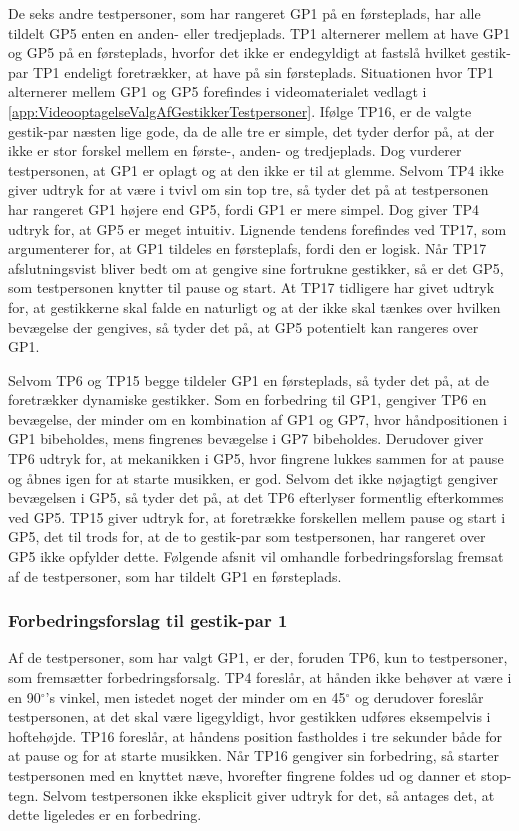 De seks andre testpersoner, som har rangeret GP1 på en førsteplads, har alle tildelt GP5 enten en anden- eller tredjeplads. TP1 alternerer mellem at have GP1 og GP5 på en førsteplads, hvorfor det ikke er endegyldigt at fastslå hvilket gestik-par TP1 endeligt foretrækker, at have på sin førsteplads. Situationen hvor TP1 alternerer mellem GP1 og GP5 forefindes i videomaterialet vedlagt i \autoref{app:VideooptagelseValgAfGestikkerTestpersoner}. Ifølge TP16, er de valgte gestik-par næsten lige gode, da de alle tre er simple, det tyder derfor på, at der ikke er stor forskel mellem en første-, anden- og tredjeplads. Dog vurderer testpersonen, at GP1 er oplagt og at den ikke er til at glemme. Selvom TP4 ikke giver udtryk for at være i tvivl om sin top tre, så tyder det på at testpersonen har rangeret GP1 højere end GP5, fordi GP1 er mere simpel. Dog giver TP4 udtryk for, at GP5 er meget intuitiv. Lignende tendens forefindes ved TP17, som argumenterer for, at GP1 tildeles en førsteplafs, fordi den er logisk. Når TP17 afslutningsvist bliver bedt om at gengive sine fortrukne gestikker, så er det GP5, som testpersonen knytter til pause og start. At TP17 tidligere har givet udtryk for, at gestikkerne skal falde en naturligt og at der ikke skal tænkes over hvilken bevægelse der gengives, så tyder det på, at GP5 potentielt kan rangeres over GP1.

Selvom TP6 og TP15 begge tildeler GP1 en førsteplads, så tyder det på, at de foretrækker dynamiske gestikker. Som en forbedring til GP1, gengiver TP6 en bevægelse, der minder om en kombination af GP1 og GP7, hvor håndpositionen i GP1 bibeholdes, mens fingrenes bevægelse i GP7 bibeholdes. Derudover giver TP6 udtryk for, at mekanikken i GP5, hvor fingrene lukkes sammen for at pause og åbnes igen for at starte musikken, er god. Selvom det ikke nøjagtigt gengiver bevægelsen i GP5, så tyder det på, at det TP6 efterlyser formentlig efterkommes ved GP5. TP15 giver udtryk for, at foretrække forskellen mellem pause og start i GP5, det til trods for, at de to gestik-par som testpersonen, har rangeret over GP5 ikke opfylder dette.\blankline
%
Følgende afsnit vil omhandle forbedringsforslag fremsat af de testpersoner, som har tildelt GP1 en førsteplads.
%
\subsubsection{Forbedringsforslag til gestik-par 1}
\label{TestresultaterValgAfGestikkerForbedringGP1Pause}
%
Af de testpersoner, som har valgt GP1, er der, foruden TP6, kun to testpersoner, som fremsætter forbedringsforsalg. TP4 foreslår, at hånden ikke behøver at være i en 90$^{\circ}$'s vinkel, men istedet noget der minder om en 45$^{\circ}$ og derudover foreslår testpersonen, at det skal være ligegyldigt, hvor gestikken udføres eksempelvis i hoftehøjde. TP16 foreslår, at håndens position fastholdes i tre sekunder både for at pause og for at starte musikken. Når TP16 gengiver sin forbedring, så starter testpersonen med en knyttet næve, hvorefter fingrene foldes ud og danner et stop-tegn. Selvom testpersonen ikke eksplicit giver udtryk for det, så antages det, at dette ligeledes er en forbedring.
%
